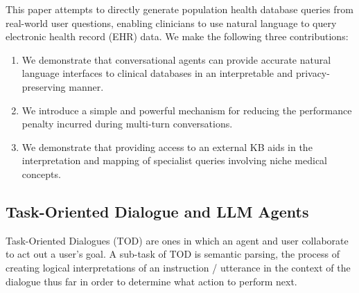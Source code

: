 \documentclass[11pt]{article}
\begin{document}
This paper attempts to directly generate population health database queries from real-world user questions, enabling clinicians to use natural language to query electronic health record (EHR) data.
We make the following three contributions:

\begin{enumerate}

\item We demonstrate that conversational agents can provide accurate natural language interfaces to clinical databases in an interpretable and privacy-preserving manner.

\item We introduce a simple and powerful mechanism for reducing the performance penalty incurred during multi-turn conversations. %

\item We demonstrate that providing access to an external KB aids in the interpretation and mapping of specialist queries involving niche medical concepts.
\end{enumerate}


\subsection{Task-Oriented Dialogue and LLM Agents}
Task-Oriented Dialogues (TOD) are ones in which an agent and user collaborate to act out a user's goal.
A sub-task of TOD is semantic parsing, the process of creating logical interpretations of an instruction / utterance in the context of the dialogue thus far in order to determine what action to perform next.
\end{document}
